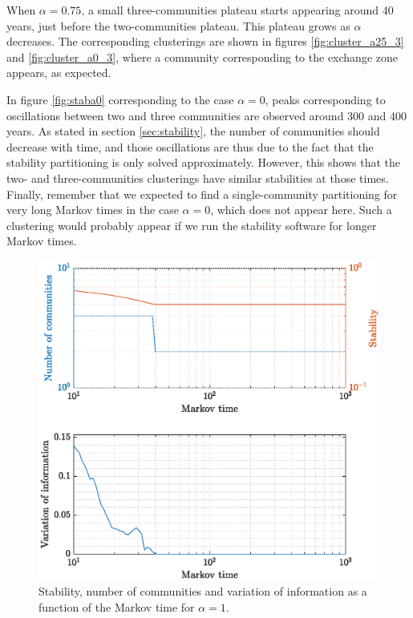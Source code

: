 When $\alpha = 0.75$, a small three-communities plateau starts appearing around 40 years, just before the two-communities plateau. This plateau grows as $\alpha$ decreases. The corresponding clusterings are shown in figures \ref{fig:cluster_a25_3} and \ref{fig:cluster_a0_3}, where a community corresponding to the exchange zone appears, as expected.

In figure \ref{fig:staba0} corresponding to the case $\alpha = 0$, peaks corresponding to oscillations between two and three communities are observed around 300 and 400 years. As stated in section \ref{sec:stability}, the number of communities should decrease with time, and those oscillations are thus due to the fact that the stability partitioning is only solved approximately. However, this shows that the two- and three-communities clusterings have similar stabilities at those times. Finally, remember that we expected to find a single-community partitioning for very long Markov times in the case $\alpha = 0$, which does not appear here. Such a clustering would probably appear if we run the stability software for longer Markov times.


\begin{figure}[!htp]
	\centering
	\includegraphics[width = .7\textwidth, height = .4\textheight]{fig/problem2box/stab_a1.eps}
	\caption{Stability, number of communities and variation of information as a function of the Markov time for $\alpha = 1$.}
	\label{fig:staba1}
\end{figure}


